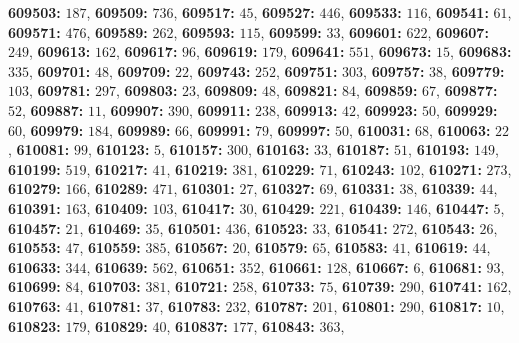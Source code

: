 \textsf{\bfseries 609503:} $187$, \textsf{\bfseries 609509:} $736$, \textsf{\bfseries 609517:} $45$, \textsf{\bfseries 609527:} $446$, \textsf{\bfseries 609533:} $116$, \textsf{\bfseries 609541:} $61$, \textsf{\bfseries 609571:} $476$, \textsf{\bfseries 609589:} $262$, \textsf{\bfseries 609593:} $115$, \textsf{\bfseries 609599:} $33$, \textsf{\bfseries 609601:} $622$, \textsf{\bfseries 609607:} $249$, \textsf{\bfseries 609613:} $162$, \textsf{\bfseries 609617:} $96$, \textsf{\bfseries 609619:} $179$, \textsf{\bfseries 609641:} $551$, \textsf{\bfseries 609673:} $15$, \textsf{\bfseries 609683:} $335$, \textsf{\bfseries 609701:} $48$, \textsf{\bfseries 609709:} $22$, \textsf{\bfseries 609743:} $252$, \textsf{\bfseries 609751:} $303$, \textsf{\bfseries 609757:} $38$, \textsf{\bfseries 609779:} $103$, \textsf{\bfseries 609781:} $297$, \textsf{\bfseries 609803:} $23$, \textsf{\bfseries 609809:} $48$, \textsf{\bfseries 609821:} $84$, \textsf{\bfseries 609859:} $67$, \textsf{\bfseries 609877:} $52$, \textsf{\bfseries 609887:} $11$, \textsf{\bfseries 609907:} $390$, \textsf{\bfseries 609911:} $238$, \textsf{\bfseries 609913:} $42$, \textsf{\bfseries 609923:} $50$, \textsf{\bfseries 609929:} $60$, \textsf{\bfseries 609979:} $184$, \textsf{\bfseries 609989:} $66$, \textsf{\bfseries 609991:} $79$, \textsf{\bfseries 609997:} $50$, \textsf{\bfseries 610031:} $68$, \textsf{\bfseries 610063:} $22$, \textsf{\bfseries 610081:} $99$, \textsf{\bfseries 610123:} $5$, \textsf{\bfseries 610157:} $300$, \textsf{\bfseries 610163:} $33$, \textsf{\bfseries 610187:} $51$, \textsf{\bfseries 610193:} $149$, \textsf{\bfseries 610199:} $519$, \textsf{\bfseries 610217:} $41$, \textsf{\bfseries 610219:} $381$, \textsf{\bfseries 610229:} $71$, \textsf{\bfseries 610243:} $102$, \textsf{\bfseries 610271:} $273$, \textsf{\bfseries 610279:} $166$, \textsf{\bfseries 610289:} $471$, \textsf{\bfseries 610301:} $27$, \textsf{\bfseries 610327:} $69$, \textsf{\bfseries 610331:} $38$, \textsf{\bfseries 610339:} $44$, \textsf{\bfseries 610391:} $163$, \textsf{\bfseries 610409:} $103$, \textsf{\bfseries 610417:} $30$, \textsf{\bfseries 610429:} $221$, \textsf{\bfseries 610439:} $146$, \textsf{\bfseries 610447:} $5$, \textsf{\bfseries 610457:} $21$, \textsf{\bfseries 610469:} $35$, \textsf{\bfseries 610501:} $436$, \textsf{\bfseries 610523:} $33$, \textsf{\bfseries 610541:} $272$, \textsf{\bfseries 610543:} $26$, \textsf{\bfseries 610553:} $47$, \textsf{\bfseries 610559:} $385$, \textsf{\bfseries 610567:} $20$, \textsf{\bfseries 610579:} $65$, \textsf{\bfseries 610583:} $41$, \textsf{\bfseries 610619:} $44$, \textsf{\bfseries 610633:} $344$, \textsf{\bfseries 610639:} $562$, \textsf{\bfseries 610651:} $352$, \textsf{\bfseries 610661:} $128$, \textsf{\bfseries 610667:} $6$, \textsf{\bfseries 610681:} $93$, \textsf{\bfseries 610699:} $84$, \textsf{\bfseries 610703:} $381$, \textsf{\bfseries 610721:} $258$, \textsf{\bfseries 610733:} $75$, \textsf{\bfseries 610739:} $290$, \textsf{\bfseries 610741:} $162$, \textsf{\bfseries 610763:} $41$, \textsf{\bfseries 610781:} $37$, \textsf{\bfseries 610783:} $232$, \textsf{\bfseries 610787:} $201$, \textsf{\bfseries 610801:} $290$, \textsf{\bfseries 610817:} $10$, \textsf{\bfseries 610823:} $179$, \textsf{\bfseries 610829:} $40$, \textsf{\bfseries 610837:} $177$, \textsf{\bfseries 610843:} $363$, 
